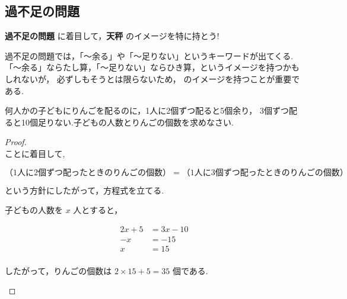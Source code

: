 \subsection{過不足の問題}

    \begin{techniquebox}[tech:07]{\textbf{過不足の問題}}
        \fitblankbf[変わらないものの量]{} に着目して，\textbf{天秤} のイメージを特に持とう!
    \end{techniquebox}

    過不足の問題では，「〜余る」や「〜足りない」というキーワードが出てくる.
    「〜余る」ならたし算，「〜足りない」ならひき算，というイメージを持つかもしれないが，
    必ずしもそうとは限らないため， のイメージを持つことが重要である.

\begin{example}[【例題 5】]
    何人かの子どもにりんごを配るのに，1人に2個ずつ配ると5個余り，
    3個ずつ配ると10個足りない.子どもの人数とりんごの個数を求めなさい.
\end{example}

\begin{proof}\mbox{}\\
    ことに着目して,

    \[（1人に2個ずつ配ったときのりんごの個数）=（1人に3個ずつ配ったときのりんごの個数）\]

    という方針にしたがって，方程式を立てる.

    \begin{hiddenanswer}
        子どもの人数を $x$ 人とすると，
        \vspace{1em}

        \begin{align*}
            2x + 5 &= 3x - 10 \\
            -x &= -15 \\
            x &= 15 \\
        \end{align*}

        したがって，りんごの個数は $2 \times 15 + 5 = 35$ 個である.

    \end{hiddenanswer}
\end{proof}
\newpage
